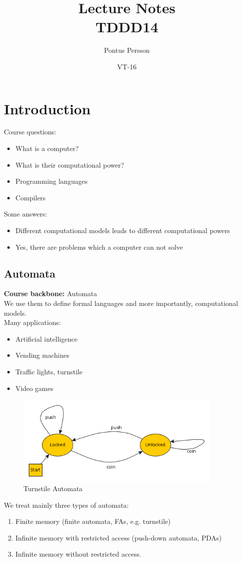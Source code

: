 \documentclass[a4paper]{article}
\title{Lecture Notes\\TDDD14}
\author{Pontus Persson}
\date{VT-16}
\begin{document}
\maketitle
\tableofcontents
{}
\section{Introduction}
Course questions:
\begin{itemize}
    \item What is a computer?
    \item What is their computational power?
    \item Programming languages
    \item Compilers
\end{itemize}
Some answers:
\begin{itemize}
    \item Different computational models leads to different computational powers
    \item Yes, there are problems which a computer can not solve
\end{itemize}
\subsection{Automata}
\textbf{Course backbone:} Automata\\
We use them to define formal languages and more importantly, computational models.
\\Many applications:
\begin{itemize}
    \item Artificial intelligence
    \item Vending machines
    \item Traffic lights, turnstile
    \item Video games
\end{itemize}
\begin{figure}[H]
    \centering
    \includegraphics[width=0.9\textwidth]{turnstile.png}
    \caption{Turnstile Automata}
    \label{fig:turnstile}
\end{figure}
We treat mainly three types of automata:
\begin{enumerate}
    \item Finite memory (finite automata, FAs, e.g. turnstile)
    \item Infinite memory with restricted access (push-down automata, PDAs)
    \item Infinite memory without restricted access.
\end{enumerate}
\end{document}
